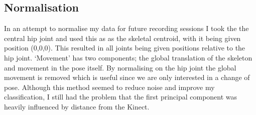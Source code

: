 \begin{figure}[h]
\centering
\begin{minipage}{8.0cm}
    \centering
    \label{fig:1}
\end{minipage}
\vspace{2.0cm}
\qquad
\begin{minipage}{8.0cm}
    \centering
    \label{fig:2}
\end{minipage}
\end{figure}


\subsection{Normalisation}
In an attempt to normalise my data for future recording sessions I took the the central hip joint and used this as as the skeletal centroid, with it being given position (0,0,0). This resulted in all joints being given positions relative to the hip joint. `Movement' has two components; the global translation of the skeleton and movement in the pose itself. By normalising on the hip joint the global movement is removed which is useful since we are only interested in a change of pose. Although this method seemed to reduce noise and improve my classification, I still had the problem that the first principal component was heavily influenced by distance from the Kinect.

